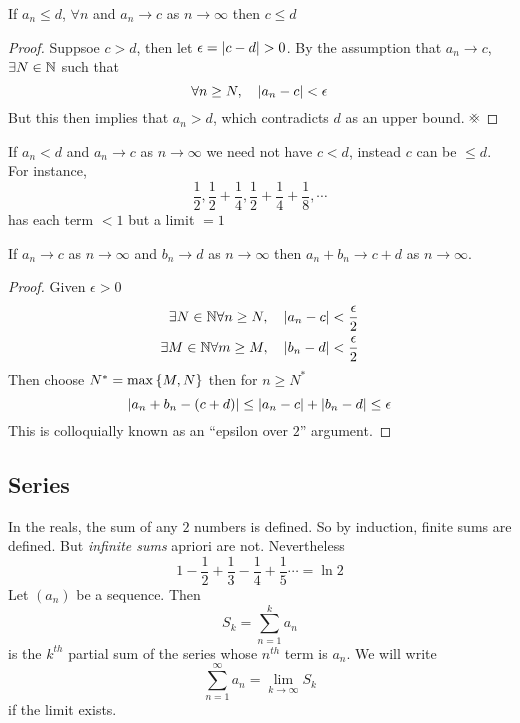 \documentclass{article}
\begin{document}
\begin{nprop}\label{prop:3-6}
    If $a_n \leq d$, $\forall n$ and $a_n \rightarrow c$ as $n \rightarrow \infty$ then $c \leq d$
\end{nprop}
\begin{proof}
    Suppsoe $c > d$,
    then let $\epsilon = \left\lvert c - d\right\rvert > 0$.
    By the assumption that $a_n \rightarrow c$, $\exists N \in \mathbb{N}$ such that
    \[
        \forall n \geq N, \quad \left\lvert a_n - c\right\rvert < \epsilon  
    \]
    But this then implies that $a_n > d$, which contradicts $d$ as an upper bound. $\contradiction$
\end{proof}
\begin{warning}
    If $a_n < d$ and $a_n \rightarrow c$ as $n \rightarrow \infty$ we need not have
    $c < d$, instead $c$ can be $\leq d$.
    For instance,
    \[
        \frac{1}{2}, \frac{1}{2} + \frac{1}{4}, \frac{1}{2} + \frac{1}{4} + \frac{1}{8}, \cdots   
    \]
    has each term $<1$ but a limit $=1$
\end{warning}

\begin{nprop}\label{prop:3-7}
    If $a_n \rightarrow c$ as $n \rightarrow \infty$ and $b_n \rightarrow d$ as $n \rightarrow \infty$
    then $a_n + b_n \rightarrow c + d$ as $n \rightarrow \infty$.
\end{nprop}
\begin{proof}
    Given $\epsilon >0$
    \begin{align*}
        \exists N \in \mathbb{N} \forall n \geq N, \quad \left\lvert a_n - c\right\rvert < \frac{\epsilon}{2} \\
        \exists M \in \mathbb{N} \forall m \geq M, \quad \left\lvert b_n - d\right\rvert < \frac{\epsilon}{2}
    \end{align*}
    Then choose $N^* = \max \left\{ M, N \right\}$ then for $n \geq N^*$
    \[
        \left\lvert a_n + b_n - (c + d)\right\rvert \leq \left\lvert a_n - c\right\rvert + \left\lvert b_n - d\right\rvert \leq \epsilon  
    \]
    This is colloquially known as an ``epsilon over $2$'' argument.
\end{proof}

\subsection{Series}
In the reals, the sum of any $2$ numbers is defined.
So by induction, finite sums are defined. 
But \emph{infinite sums} apriori are not.
Nevertheless
\[
    1 - \frac{1}{2} + \frac{1}{3} - \frac{1}{4} + \frac{1}{5} \cdots = \ln 2    
\]
Let $(a_n)$ be a sequence. 
Then
\[
    S_k = \sum_{n=1}^{k} a_n
\]
is the $k^{th}$ partial sum of the series whose $n^{th}$ term is $a_n$.
We will write 
\[
    \sum_{n=1}^\infty a_n = \lim_{k \rightarrow \infty} S_k
\]
if the limit exists.
\end{document}
